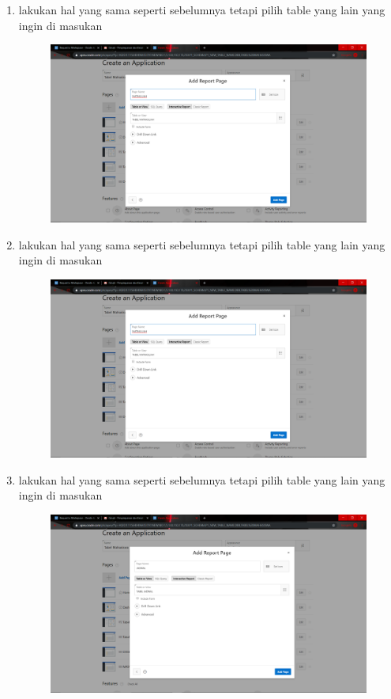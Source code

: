 \begin{enumerate}
\item lakukan hal yang sama seperti sebelumnya tetapi pilih table yang lain yang ingin di masukan
\begin{figure}[H]
    \centering
    \includegraphics[scale=0.1]{figures/23}
    \caption{}
    \label{Hello World}
\end{figure}

\item lakukan hal yang sama seperti sebelumnya tetapi pilih table yang lain yang ingin di masukan
\begin{figure}[H]
    \centering
    \includegraphics[scale=0.1]{figures/23}
    \caption{}
    \label{Automatic1}
\end{figure}

\item lakukan hal yang sama seperti sebelumnya tetapi pilih table yang lain yang ingin di masukan
\begin{figure}[H]
    \centering
    \includegraphics[scale=0.1]{figures/24}
    \caption{}
    \label{Automatic2}
\end{figure}


\end{enumerate}
